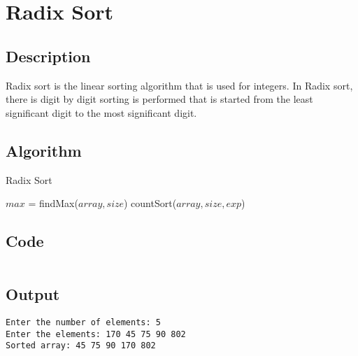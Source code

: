 \section{Radix Sort}

\subsection{Description}
Radix sort is the linear sorting algorithm that is used for integers. In Radix sort, there is digit by digit sorting is performed that is started from the least significant digit to the most significant digit.

\subsection{Algorithm}


\begin{algorithm}[H]
    \caption{Radix Sort}
    \begin{algorithmic}[1]
        \State $max$ = findMax($array, size$)
        \State countSort($array, size, exp$)
        \EndFor
        \EndProcedure
    \end{algorithmic}
\end{algorithm}

\subsection{Code}

\inputminted[fontsize=\footnotesize,bgcolor=bg,linenos,autogobble,frame=single,framerule=0.01pt,rulecolor=FSBorder,stripall]{c++}{code/radix.cpp}


\subsection{Output}

\begin{lstlisting}[style=output]
Enter the number of elements: 5
Enter the elements: 170 45 75 90 802
Sorted array: 45 75 90 170 802  
\end{lstlisting}